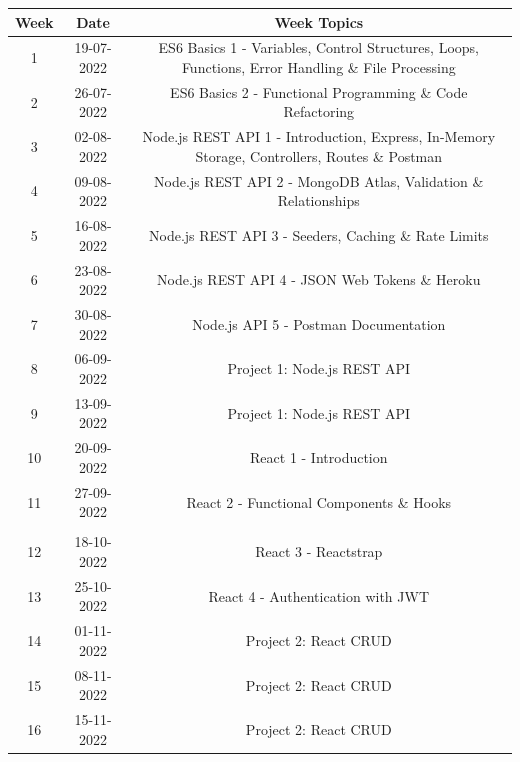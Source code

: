 \documentclass{article}
\begin{document}
\renewcommand{\arraystretch}{1.5}
\begin{tabular}{|c|c|c|c|}
	\hline
	\textbf{Week} & \textbf{Date}     & \multicolumn{2}{c|}{\textbf{Week Topics}}        \\ \hline
	\footnotesize 1      & \footnotesize 19-07-2022 & \multicolumn{2}{c|}{\footnotesize ES6 Basics 1 - Variables, Control Structures, Loops, Functions, Error Handling \& File Processing} \\ \hline
	\footnotesize 2      & \footnotesize 26-07-2022 & \multicolumn{2}{c|}{\footnotesize ES6 Basics 2 - Functional Programming \& Code Refactoring} \\ \hline
	\footnotesize 3      & \footnotesize 02-08-2022 & \multicolumn{2}{c|}{\footnotesize Node.js REST API 1 - Introduction, Express, In-Memory Storage, Controllers, Routes \& Postman} \\ \hline
	\footnotesize 4      & \footnotesize 09-08-2022 & \multicolumn{2}{c|}{\footnotesize Node.js REST API 2 - MongoDB Atlas, Validation \& Relationships} \\ \hline
	\footnotesize 5      & \footnotesize 16-08-2022 & \multicolumn{2}{c|}{\footnotesize Node.js REST API 3 - Seeders, Caching \& Rate Limits} \\ \hline
	\footnotesize 6      & \footnotesize 23-08-2022 & \multicolumn{2}{c|}{\footnotesize Node.js REST API 4 - JSON Web Tokens \& Heroku} \\ \hline
	\footnotesize 7      & \footnotesize 30-08-2022 & \multicolumn{2}{c|}{\footnotesize Node.js API 5 - Postman Documentation} \\ \hline
	\footnotesize 8      & \footnotesize 06-09-2022 & \multicolumn{2}{c|}{\footnotesize Project 1: Node.js REST API} \\ \hline
	\footnotesize 9      & \footnotesize 13-09-2022 & \multicolumn{2}{c|}{\footnotesize Project 1: Node.js REST API} \\ \hline
	\footnotesize 10      & \footnotesize 20-09-2022 & \multicolumn{2}{c|}{\footnotesize React 1 - Introduction} \\ \hline
	\footnotesize 11     & \footnotesize 27-09-2022 & \multicolumn{2}{c|}{\footnotesize React 2 - Functional Components \& Hooks} \\ \hline
	\rowcolor{yellow} \multicolumn{4}{|c|}{\footnotesize Mid Term Break}                    \\ \hline
	\footnotesize 12     & \footnotesize 18-10-2022 & \multicolumn{2}{c|}{\footnotesize React 3 - Reactstrap}     \\ \hline
	\footnotesize 13     & \footnotesize 25-10-2022 & \multicolumn{2}{c|}{\footnotesize React 4 - Authentication with JWT}    \\ \hline
	\footnotesize 14     & \footnotesize 01-11-2022 & \multicolumn{2}{c|}{\footnotesize Project 2: React CRUD}     \\ \hline
	\footnotesize 15     & \footnotesize 08-11-2022 & \multicolumn{2}{c|}{\footnotesize Project 2: React CRUD}     \\ \hline
	\footnotesize 16     & \footnotesize 15-11-2022 & \multicolumn{2}{c|}{\footnotesize Project 2: React CRUD}     \\ \hline
\end{tabular}
\end{document}
